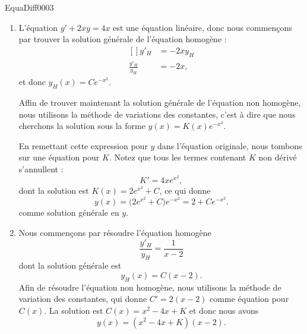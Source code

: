 \begin{corrige}{EquaDiff0003}

\begin{enumerate}

\item
L'équation $y'+2xy=4x$ est une équation linéaire, donc nous commençons par trouver la solution générale de l'équation homogène :
\begin{equation}
	\begin{aligned}[]
		y'_H&=-2xy_H\\
		\frac{ y'_H }{ y_H }&=-2x,
	\end{aligned}
\end{equation}
et donc $y_H(x)=Ce^{-x^2}$.

Affin de trouver maintenant la solution générale de l'équation non homogène, nous utilisons la méthode de variations des constantes, c'est à dire que nous cherchons la solution sous la forme $y(x)=K(x) e^{-x^2}$.

En remettant cette expression pour $y$ dans l'équation originale, nous tombons sur une équation pour $K$. Notez que tous les termes contenant $K$ non dérivé s'annullent :
\begin{equation}
	K'=4x e^{x^2},
\end{equation}
dont la solution est $K(x)=2 e^{x^2}+C$, ce qui donne
\begin{equation}
	y(x)=\big( 2 e^{x^2}+C \big) e^{-x^2}  =2+C e^{-x^2}.
\end{equation}
comme solution générale en $y$.


\item
Nous commençons par résoudre l'équation homogène
\begin{equation}
	\frac{ y'_H }{ y_H }=\frac{1}{ x-2 }
\end{equation}
dont la solution générale est
\begin{equation}
	y_H(x)=C(x-2).
\end{equation}
Afin de résoudre l'équation non homogène, nous utilisons la méthode de variation des constantes, qui donne $C'=2(x-2)$ comme équation pour $C(x)$. La solution est $C(x)=x^2-4x+K$ et donc nous avons
\begin{equation}
	y(x)=(x^2-4x+K)(x-2).
\end{equation}


\end{enumerate}
\end{corrige}
